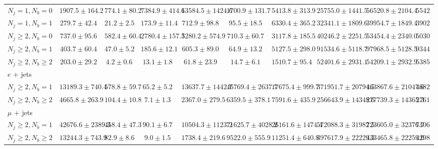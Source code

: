 \begin{tabular}{l|ccccccc|cc}
        $N_{j} = 1, N_{b} = 0$       & $1907.5 \pm 164.2$ & $774.1 \pm 80.2$ & $7384.9 \pm 414.6$  & $13584.5 \pm 1424.6$ & $1700.9 \pm 131.7$ & $5413.8 \pm 313.9$ & $25755.0 \pm 1441.5$ & $56520.8 \pm 2104.4$ & $55427$  \\
        $N_{j} = 1, N_{b} = 1$       & $279.7 \pm 42.4$   & $21.2 \pm 2.5$   & $173.9 \pm 11.4$    & $712.9 \pm 98.8$     & $95.5 \pm 18.5$    & $6330.4 \pm 365.2$ & $32341.1 \pm 1809.6$ & $39954.7 \pm 1849.4$ & $39021$  \\
        $N_{j} \geq 2, N_{b} = 0$    & $737.0 \pm 95.6$   & $582.4 \pm 60.4$ & $2780.4 \pm 157.3$  & $5280.2 \pm 574.9$   & $710.3 \pm 60.7$   & $3117.8 \pm 185.5$ & $40246.2 \pm 2251.5$ & $53454.4 \pm 2340.0$ & $50301$  \\
        $N_{j} \geq 2, N_{b} = 1$    & $403.7 \pm 60.4$   & $47.0 \pm 5.2$   & $185.6 \pm 12.1$    & $605.3 \pm 89.0$     & $64.9 \pm 13.2$    & $5127.5 \pm 298.0$ & $91534.6 \pm 5118.7$ & $97968.5 \pm 5128.5$ & $93440$  \\
        $N_{j} \geq 2, N_{b} \geq 2$ & $203.0 \pm 29.2$   & $4.2 \pm 0.6$    & $13.1 \pm 1.8$      & $61.8 \pm 23.9$      & $14.7 \pm 6.1$     & $1510.7 \pm 95.4$  & $52401.6 \pm 2931.1$ & $54209.1 \pm 2932.9$ & $53859$  \\
        \hline
        \multicolumn{10}{l}{$e$ + jets}   \\
        \hline
        $N_{j} \geq 2, N_{b} = 1$          & $13189.3 \pm 740.4$  & $578.8 \pm 59.7$   & $65.2 \pm 5.2$     & $13637.7 \pm 1442.7$   & $46769.4 \pm 2637.7$ & $17675.4 \pm 999.7$  & $371951.7 \pm 20794.5$ & $463867.6 \pm 21047.6$ & $468222$ \\
        $N_{j} \geq 2, N_{b} \geq 2$       & $4665.8 \pm 263.9$   & $104.4 \pm 10.8$   & $7.1 \pm 1.3$      & $2367.0 \pm 279.5$     & $6359.5 \pm 378.1$   & $7591.6 \pm 435.9$   & $256643.9 \pm 14348.6$ & $277739.3 \pm 14365.3$ & $276116$ \\
        \hline
        \multicolumn{10}{l}{$\mu$ + jets} \\
        \hline
        $N_{j} \geq 2, N_{b} = 1$          & $42676.6 \pm 2389.3$ & $458.4 \pm 47.3$   & $90.1 \pm 6.7$     & $10504.3 \pm 1123.2$   & $71625.7 \pm 4028.2$ & $26161.6 \pm 1474.4$ & $572088.3 \pm 31982.5$ & $723605.0 \pm 32376.7$ & $710650$ \\
        $N_{j} \geq 2, N_{b} \geq 2$       & $13244.3 \pm 743.9$  & $82.9 \pm 8.6$     & $9.0 \pm 1.5$      & $1738.4 \pm 219.6$     & $9522.0 \pm 555.9$   & $11251.4 \pm 640.8$  & $397617.9 \pm 22229.3$ & $433465.8 \pm 22259.0$ & $429861$ \\
        \hline
    \end{tabular}